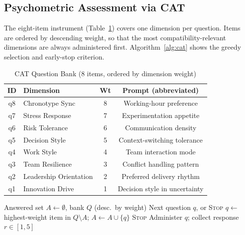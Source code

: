 \documentclass[conference]{IEEEtran}
\begin{document}
\subsection{Psychometric Assessment via CAT}

The eight-item instrument (Table~\ref{tab:items}) covers one
dimension per question.  Items are ordered by descending weight,
so that the most compatibility-relevant dimensions are always
administered first.  Algorithm~\ref{alg:cat} shows the greedy
selection and early-stop criterion.

\begin{table}[t]
\caption{CAT Question Bank (8 items, ordered by dimension weight)}
\label{tab:items}
\centering
\small
\setlength{\tabcolsep}{5pt}
\begin{tabular}{clcc}
\toprule
ID & Dimension & Wt & Prompt (abbreviated) \\
\midrule
q8 & Chronotype Sync        & 8 & Working-hour preference \\
q7 & Stress Response        & 7 & Experimentation appetite \\
q6 & Risk Tolerance         & 6 & Communication density \\
q5 & Decision Style         & 5 & Context-switching tolerance \\
q4 & Work Style             & 4 & Team interaction mode \\
q3 & Team Resilience        & 3 & Conflict handling pattern \\
q2 & Leadership Orientation & 2 & Preferred delivery rhythm \\
q1 & Innovation Drive       & 1 & Decision style in uncertainty \\
\bottomrule
\end{tabular}
\end{table}

\begin{algorithm}[t]
\caption{Greedy CAT with Early Stop}
\label{alg:cat}
\begin{algorithmic}[1]
\REQUIRE Answered set $A \leftarrow \emptyset$, bank $Q$ (desc.\ by weight)
\ENSURE Next question $q$, or \textsc{Stop}
\REPEAT
  \STATE $q \leftarrow$ highest-weight item in $Q \setminus A$;\;
    $A \leftarrow A \cup \{q\}$
    \RETURN \textsc{Stop}
  \ENDIF
  \STATE Administer $q$; collect response $r \in [1,5]$
\end{algorithmic}
\end{algorithm}
\end{document}
